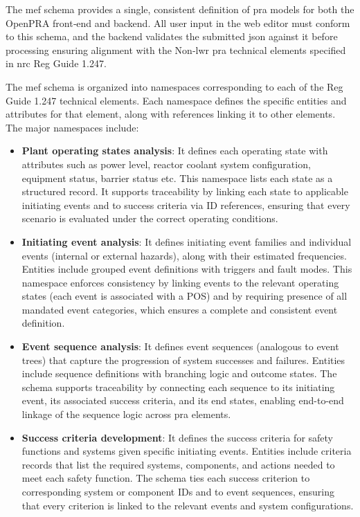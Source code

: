 The \acrshort{mef} schema provides a single, consistent definition of \acrshort{pra} models for both the OpenPRA front‑end and backend. All user input in the web editor must conform to this schema, and the backend validates the submitted \acrshort{json} against it before processing ensuring alignment with the Non‑\acrshort{lwr} \acrshort{pra} technical elements specified in \acrshort{nrc} Reg Guide 1.247.

The \acrshort{mef} schema is organized into namespaces corresponding to each of the Reg Guide 1.247 technical elements.  Each namespace defines the specific entities and attributes for that element, along with references linking it to other elements. The major namespaces include:

\begin{itemize}
  \item \textbf{Plant operating states analysis}: It defines each operating state with attributes such as power level, reactor coolant system configuration, equipment status, barrier status etc.  This namespace lists each state as a structured record.  It supports traceability by linking each state to applicable initiating events and to success criteria via ID references, ensuring that every scenario is evaluated under the correct operating conditions.
  \item \textbf{Initiating event analysis}: It defines initiating event families and individual events (internal or external hazards), along with their estimated frequencies.  Entities include grouped event definitions with triggers and fault modes.  This namespace enforces consistency by linking events to the relevant operating states (each event is associated with a POS) and by requiring presence of all mandated event categories, which ensures a complete and consistent event definition.
  \item \textbf{Event sequence analysis}: It defines event sequences (analogous to event trees) that capture the progression of system successes and failures.  Entities include sequence definitions with branching logic and outcome states.  The schema supports traceability by connecting each sequence to its initiating event, its associated success criteria, and its end states, enabling end-to-end linkage of the sequence logic across \acrshort{pra} elements.
  \item \textbf{Success criteria development}: It defines the success criteria for safety functions and systems given specific initiating events.  Entities include criteria records that list the required systems, components, and actions needed to meet each safety function.  The schema ties each success criterion to corresponding system or component IDs and to event sequences, ensuring that every criterion is linked to the relevant events and system configurations.

\end{itemize}
